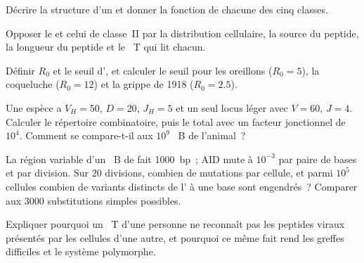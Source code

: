 \begin{exercise}[$\star$]\label{exo:b3:adaptive-immunity:2}
Décrire la structure d'un  et donner la fonction de chacune des
cinq classes.
\end{exercise}

\begin{exercise}[$\star$]\label{exo:b3:adaptive-immunity:3}
Opposer le  et celui de classe~II par la distribution
cellulaire, la source du peptide, la longueur du peptide et le
~T qui lit chacun.
\end{exercise}

\begin{exercise}[$\star$]\label{exo:b3:adaptive-immunity:4}
Définir $R_{0}$ et le seuil d', et calculer le seuil
pour les oreillons ($R_{0} = 5$), la coqueluche ($R_{0} = 12$) et la
grippe de 1918 ($R_{0} = 2.5$).
\end{exercise}

\begin{exercise}[$\star\star$]\label{exo:b3:adaptive-immunity:5}
Une espèce a $V_{H} = 50$, $D = 20$, $J_{H} = 5$ et un seul locus léger
avec $V = 60$, $J = 4$. Calculer le répertoire combinatoire, puis le
total avec un facteur jonctionnel de $10^{4}$. Comment se compare-t-il
aux $10^{9}$ ~B de l'animal~?
\end{exercise}

\begin{exercise}[$\star\star$]\label{exo:b3:adaptive-immunity:6}
La région variable d'un ~B de  fait
\qty{1000}{bp}~; AID mute à $10^{-3}$ par paire de bases et par
division. Sur $20$ divisions, combien de mutations par cellule, et parmi
$10^{5}$ cellules combien de variants distincts de l' à une
base sont engendrés~? Comparer aux $3000$ substitutions simples
possibles.
\end{exercise}

\begin{exercise}[$\star\star$]\label{exo:b3:adaptive-immunity:7}
Expliquer pourquoi un ~T d'une personne ne reconnaît pas les
peptides viraux présentés par les cellules d'une autre, et pourquoi ce
même fait rend les greffes difficiles et le système  polymorphe.
\end{exercise}

